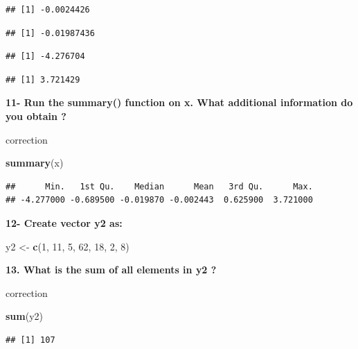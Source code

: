 \documentclass[]{book}
\newenvironment{Shaded}{\begin{snugshade}}{\end{snugshade}}
\newcommand{\DecValTok}[1]{\textcolor[rgb]{0.00,0.00,0.81}{#1}}
\newcommand{\KeywordTok}[1]{\textcolor[rgb]{0.13,0.29,0.53}{\textbf{#1}}}
\newcommand{\NormalTok}[1]{#1}
\newcommand{\StringTok}[1]{\textcolor[rgb]{0.31,0.60,0.02}{#1}}
\begin{document}
\begin{verbatim}
## [1] -0.0024426
\end{verbatim}

\begin{verbatim}
## [1] -0.01987436
\end{verbatim}

\begin{verbatim}
## [1] -4.276704
\end{verbatim}

\begin{verbatim}
## [1] 3.721429
\end{verbatim}

\textbf{11- Run the summary() function on x. What additional information do you obtain ?}

correction

\begin{Shaded}
\begin{Highlighting}[]
\KeywordTok{summary}\NormalTok{(x)}
\end{Highlighting}
\end{Shaded}

\begin{verbatim}
##      Min.   1st Qu.    Median      Mean   3rd Qu.      Max. 
## -4.277000 -0.689500 -0.019870 -0.002443  0.625900  3.721000
\end{verbatim}

\textbf{12- Create vector y2 as:}

\begin{Shaded}
\begin{Highlighting}[]
\NormalTok{y2 <-}\StringTok{ }\KeywordTok{c}\NormalTok{(}\DecValTok{1}\NormalTok{, }\DecValTok{11}\NormalTok{, }\DecValTok{5}\NormalTok{, }\DecValTok{62}\NormalTok{,  }\DecValTok{18}\NormalTok{, }\DecValTok{2}\NormalTok{, }\DecValTok{8}\NormalTok{)}
\end{Highlighting}
\end{Shaded}

\textbf{13. What is the sum of all elements in y2 ?}

correction

\begin{Shaded}
\begin{Highlighting}[]
\KeywordTok{sum}\NormalTok{(y2)}
\end{Highlighting}
\end{Shaded}

\begin{verbatim}
## [1] 107
\end{verbatim}
\end{document}
